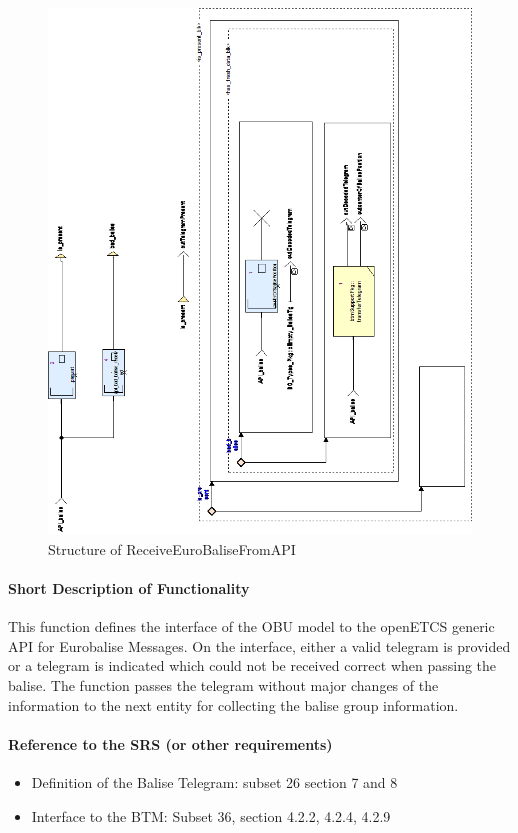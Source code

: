 \documentclass{template/openetcs_report}
\begin{document}
\begin{figure}[hbtp]
\centering
\includegraphics[width=.9\textwidth]{../images/ReceiveEuroBaliseFromAPI_diagram.png}
\caption{Structure of ReceiveEuroBaliseFromAPI}
\end{figure}

\paragraph{Short Description of Functionality}
This function defines the interface of the OBU model to the openETCS generic API for Eurobalise Messages. On the interface, either a valid telegram is provided or a telegram is indicated which could not be received correct when passing the balise. The function passes the telegram without major changes of the information to the next entity for collecting the balise group information.
	
\paragraph{Reference to the SRS (or other requirements)}
\begin{itemize}
\item Definition of the Balise Telegram: subset 26 section 7 and 8
\item Interface to the BTM: Subset 36, section  4.2.2, 4.2.4, 4.2.9
\end{itemize}
\end{document}
